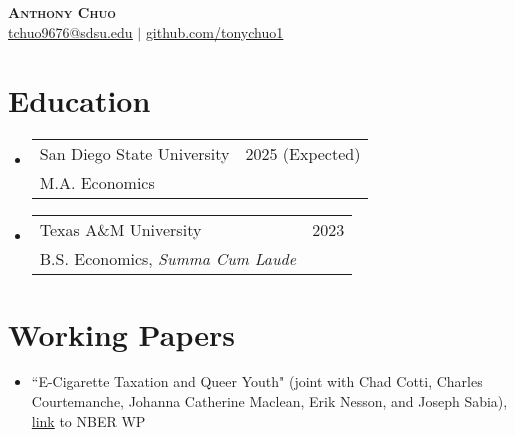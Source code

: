 \documentclass[letterpaper,11pt]{article}
\makeatletter
\newcommand{\resumeSubheading}[4]{
  \vspace{-2pt}
    \item
    \begin{tabular*}{0.97\textwidth}[t]{l@{\extracolsep{\fill}}r}
      #1 & #2 \\
      \hspace{0.15in}#3 & {#4} \\
    \end{tabular*}\vspace{-7pt}
}
\newcommand{\resumeSubHeadingListStart}{\begin{itemize}[leftmargin=0.15in, label={}]}
\newcommand{\resumeSubHeadingListEnd}{\end{itemize}}
\makeatother
\begin{document}


\begin{center}
    \textbf{\Huge \scshape Anthony Chuo} \\ \vspace{1pt}
    \href{mailto:x@x.com}{\underline{tchuo9676@sdsu.edu}} $|$ 
    \href{https://github.com/tonychuo1}{\underline{github.com/tonychuo1}}
\end{center}


\section{Education}
  \resumeSubHeadingListStart
    \resumeSubheading
      {San Diego State University}{2025 (Expected)}
      {M.A. Economics}{}
    \resumeSubheading
      {Texas A\&M University}{2023}
      {B.S. Economics, \emph{Summa Cum Laude}}{}
  \resumeSubHeadingListEnd



\section{Working Papers}
  \resumeSubHeadingListStart

      \item ``E-Cigarette Taxation and Queer Youth" 
      (joint with Chad Cotti, Charles Courtemanche,
      Johanna Catherine Maclean, Erik Nesson, and 
      Joseph Sabia), \href{URL}{link} to NBER WP

  \resumeSubHeadingListEnd

%  
%
%
\end{document}
